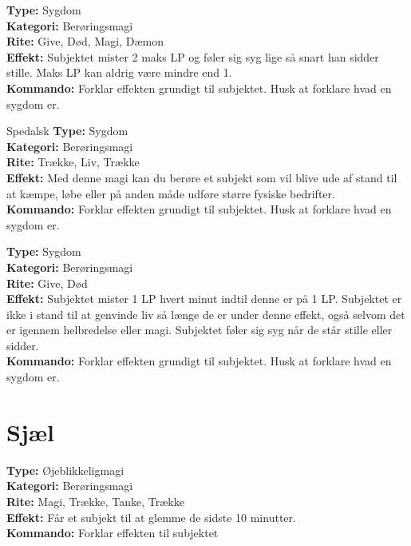 \begin{sygdom*}[Feber]
\textbf{Type:} Sygdom\\
\textbf{Kategori:} Berøringsmagi\\
\textbf{Rite:} Give, Død, Magi, Dæmon\\
\textbf{Effekt:} Subjektet mister 2 maks LP og føler sig syg lige så snart han sidder stille. Maks LP kan aldrig være mindre end 1.\\
\textbf{Kommando:} Forklar effekten grundigt til subjektet. Husk at forklare hvad en sygdom er.
\end{sygdom*}

\begin{sygdom*}Spedalsk
\textbf{Type:} Sygdom\\
\textbf{Kategori:} Berøringsmagi\\
\textbf{Rite:} Trække, Liv, Trække\\
\textbf{Effekt:} Med denne magi kan du berøre et subjekt som vil blive ude af stand til at kæmpe, løbe eller på anden måde udføre større fysiske bedrifter.\\
\textbf{Kommando:} Forklar effekten grundigt til subjektet. Husk at forklare hvad en sygdom er.
\end{sygdom*}

\begin{sygdom*}[Pest]
\textbf{Type:} Sygdom\\
\textbf{Kategori:} Berøringsmagi\\
\textbf{Rite:} Give, Død\\
\textbf{Effekt:} Subjektet mister 1 LP hvert minut indtil denne er på 1 LP. Subjektet er ikke i stand til at genvinde liv så længe de er under denne effekt, også selvom det er igennem helbredelse eller magi. Subjektet føler sig syg når de står stille eller sidder.\\
\textbf{Kommando:} Forklar effekten grundigt til subjektet. Husk at forklare hvad en sygdom er.
\end{sygdom*}

\section*{Sjæl}
\begin{nSjæl*}[Glemsel]
\textbf{Type:} Øjeblikkeligmagi\\
\textbf{Kategori:} Berøringsmagi\\
\textbf{Rite:} Magi, Trække, Tanke, Trække\\
\textbf{Effekt:} Får et subjekt til at glemme de sidste 10 minutter.\\
\textbf{Kommando:} Forklar effekten til subjektet
\end{nSjæl*}

